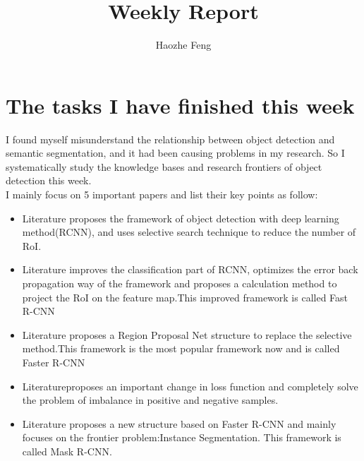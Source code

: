 \documentclass[twocolumn]{article}
\title{Weekly Report}
\author{Haozhe Feng}
\begin{document}
	\maketitle{}
\section{The tasks I have finished this week}
I found myself misunderstand the relationship between object detection and semantic segmentation, and it had been causing problems in my research. So I systematically study the knowledge bases and research frontiers of object detection this week.\\

I mainly focus on 5 important papers and list their key points as follow:
\begin{itemize}
\item Literature\cite{girshick2014rich} proposes the framework of object detection with deep learning method(RCNN), and uses selective search technique\cite{Felzenszwalb2004Efficient} to reduce the number of RoI.
\item Literature\cite{girshick2015fast} improves the classification part of RCNN, optimizes the error back propagation way of the framework and proposes a calculation method to project the RoI on the feature map.This improved framework is called Fast R-CNN
\item Literature\cite{ren2015faster} proposes a Region Proposal Net structure to replace the selective  method.This framework is the most popular framework now and is called Faster R-CNN
\item Literature\cite{DBLP:journals/corr/abs-1708-02002}proposes an important change in loss function and completely solve the problem of imbalance in positive and negative samples.
\item Literature\cite{he2017mask} proposes a new structure based on Faster R-CNN and mainly focuses on the frontier problem:Instance Segmentation. This framework is called Mask R-CNN.

\end{itemize}
\end{document}
